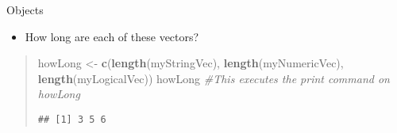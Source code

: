 \documentclass[
  ignorenonframetext,
  aspectratio=169]{beamer}
\newenvironment{Shaded}{\begin{snugshade}}{\end{snugshade}}
\newcommand{\CommentTok}[1]{\textcolor[rgb]{0.56,0.35,0.01}{\textit{#1}}}
\newcommand{\FunctionTok}[1]{\textcolor[rgb]{0.13,0.29,0.53}{\textbf{#1}}}
\newcommand{\NormalTok}[1]{#1}
\newcommand{\OtherTok}[1]{\textcolor[rgb]{0.56,0.35,0.01}{#1}}
\providecommand{\tightlist}{%
  \setlength{\itemsep}{0pt}\setlength{\parskip}{0pt}}
\begin{document}
\begin{frame}[fragile]{Objects}
\begin{itemize}
\tightlist
\item
  How long are each of these vectors?
\end{itemize}

\footnotesize

\begin{quote}
\begin{Shaded}
\begin{Highlighting}[]
\NormalTok{howLong }\OtherTok{\textless{}{-}} \FunctionTok{c}\NormalTok{(}\FunctionTok{length}\NormalTok{(myStringVec), }\FunctionTok{length}\NormalTok{(myNumericVec), }\FunctionTok{length}\NormalTok{(myLogicalVec))}
\NormalTok{howLong }\CommentTok{\#This executes the \textasciigrave{}print\textasciigrave{} command on \textasciigrave{}howLong\textasciigrave{}}
\end{Highlighting}
\end{Shaded}

\begin{verbatim}
## [1] 3 5 6
\end{verbatim}
\end{quote}

\normalsize
\end{frame}
\end{document}
